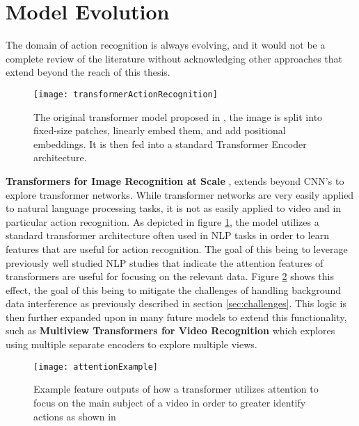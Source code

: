 \section{Model Evolution}

The domain of action recognition is always evolving, and it would not be a complete review of the literature without acknowledging other approaches that extend beyond the reach of this thesis.

\begin{figure}[h]
	\texttt{[image: transformerActionRecognition]}
	\centering
	\caption{The original transformer model proposed in \cite{transformer_og}, the image is split into fixed-size patches, linearly embed them, and add positional embeddings. It is then fed into a standard Transformer Encoder architecture.}
	\label{fig:transformerActionRecognition}
\end{figure}

\textbf{Transformers for Image Recognition at Scale} \cite{transformer_og}, extends beyond CNN's to explore transformer networks. While transformer networks are very easily applied to natural language processing tasks, it is not as easily applied to video and in particular action recognition. As depicted in figure \ref{fig:transformerActionRecognition}, the model utilizes a standard transformer architecture often used in NLP tasks in order to learn features that are useful for action recognition. The goal of this being to leverage previously well studied NLP studies that indicate the attention features of transformers are useful for focusing on the relevant data. Figure \ref{fig:attentionExample} shows this effect, the goal of this being to mitigate the challenges of handling background data interference as previously described in section \ref{sec:challenges}. This logic is then further expanded upon in many future models to extend this functionality, such as \textbf{Multiview Transformers for Video Recognition} \cite{multiview_transformers} which explores using multiple separate encoders to explore multiple views.

\begin{figure}[h]
	\texttt{[image: attentionExample]}
	\centering
	\caption{Example feature outputs of how a transformer utilizes attention to focus on the main subject of a video in order to greater identify actions as shown in \cite{transformer_og}}
	\label{fig:attentionExample}
\end{figure}


